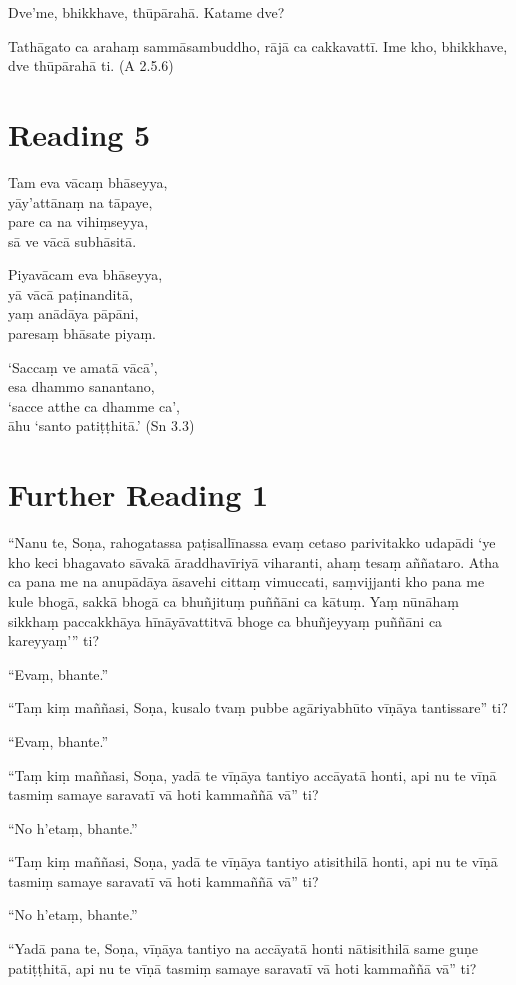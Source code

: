 Dve’me, bhikkhave, thūpārahā. Katame dve?

Tathāgato ca arahaṃ sammāsambuddho, rājā ca cakkavattī. Ime kho, bhikkhave, dve thūpārahā ti. (A 2.5.6)

\section*{Reading 5}

Tam eva vācaṃ bhāseyya,\\
yāy’attānaṃ na tāpaye,\\
pare ca na vihiṃseyya,\\
sā ve vācā subhāsitā.

Piyavācam eva bhāseyya,\\
yā vācā paṭinanditā,\\
yaṃ anādāya pāpāni,\\
paresaṃ bhāsate piyaṃ.

‘Saccaṃ ve amatā vācā’,\\
esa dhammo sanantano,\\
‘sacce atthe ca dhamme ca’,\\
āhu ‘santo patiṭṭhitā.’ (Sn 3.3)

\section*{Further Reading 1}

“Nanu te, Soṇa, rahogatassa paṭisallīnassa evaṃ cetaso parivitakko udapādi ‘ye kho keci bhagavato sāvakā āraddhavīriyā viharanti, ahaṃ tesaṃ aññataro. Atha ca pana me na anupādāya āsavehi cittaṃ vimuccati, saṃvijjanti kho pana me kule bhogā, sakkā bhogā ca bhuñjituṃ puññāni ca kātuṃ. Yaṃ nūnāhaṃ sikkhaṃ paccakkhāya hīnāyāvattitvā bhoge ca bhuñjeyyaṃ puññāni ca kareyyaṃ’” ti?

“Evaṃ, bhante.”

“Taṃ kiṃ maññasi, Soṇa, kusalo tvaṃ pubbe agāriyabhūto vīṇāya tantissare” ti?

“Evaṃ, bhante.”

“Taṃ kiṃ maññasi, Soṇa, yadā te vīṇāya tantiyo accāyatā honti, api nu te vīṇā tasmiṃ samaye saravatī vā hoti kammaññā vā” ti?

“No h’etaṃ, bhante.”

“Taṃ kiṃ maññasi, Soṇa, yadā te vīṇāya tantiyo atisithilā honti, api nu te vīṇā tasmiṃ samaye saravatī vā hoti kammaññā vā” ti?

“No h’etaṃ, bhante.”

“Yadā pana te, Soṇa, vīṇāya tantiyo na accāyatā honti nātisithilā same guṇe patiṭṭhitā, api nu te vīṇā tasmiṃ samaye saravatī vā hoti kammaññā vā” ti?

